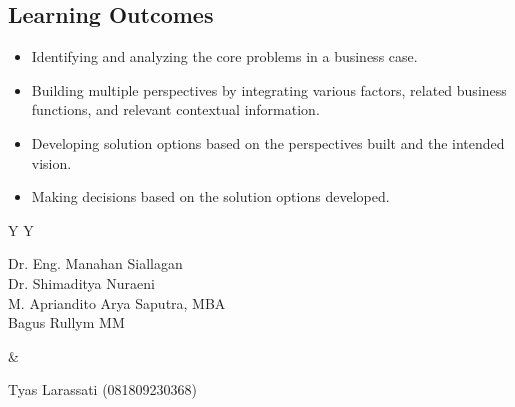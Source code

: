 \documentclass[10pt]{article}
\begin{document}
\subsection{Learning Outcomes}
\begin{itemize}
\item Identifying and analyzing the core problems in a business case.
\item Building multiple perspectives by integrating various factors, related business functions, and relevant contextual information.
\item Developing solution options based on the perspectives built and the intended vision.
\item Making decisions based on the solution options developed.
\end{itemize}

\begin{tabularx}{\textwidth}{Y Y}
\begin{tcolorbox}[colback=white,colframe=navy,title=Tim Pengajar - Dosen Pengampu,fonttitle=\bfseries]
Dr. Eng. Manahan Siallagan\\Dr. Shimaditya Nuraeni\\M. Apriandito Arya Saputra, MBA\\Bagus Rullym MM
\end{tcolorbox}&
\begin{tcolorbox}[colback=white,colframe=midblue,title=Asisten Mata Kuliah,fonttitle=\bfseries]
Tyas Larassati (081809230368)
\end{tcolorbox}
\end{tabularx}
\end{document}
